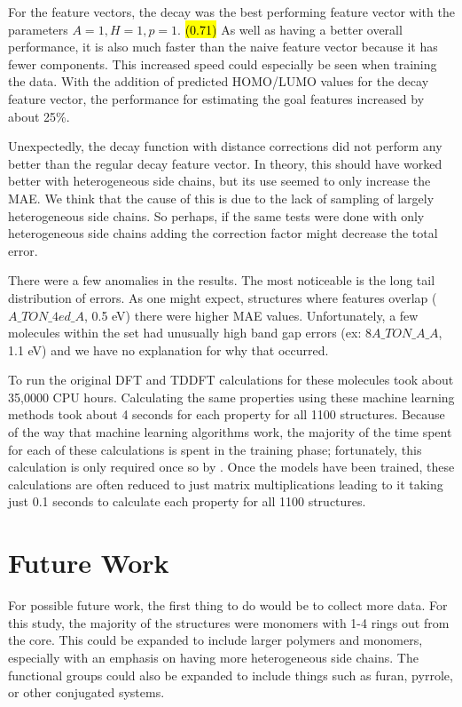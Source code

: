 \documentclass[10pt]{article}
\begin{document}
For the feature vectors, the decay was the best performing feature vector with the parameters $A = 1, H = 1, p = 1$. \hl{(0.71)} As well as having a better overall performance, it is also much faster than the naive feature vector because it has fewer components. This increased speed could especially be seen when training the data.
With the addition of predicted HOMO/LUMO values for the decay feature vector, the performance for estimating the goal features increased by about 25\%.

Unexpectedly, the decay function with distance corrections did not perform any better than the regular decay feature vector. In theory, this should have worked better with heterogeneous side chains, but its use seemed to only increase the MAE. We think that the cause of this is due to the lack of sampling of largely heterogeneous side chains. So perhaps, if the same tests were done with only heterogeneous side chains adding the correction factor might decrease the total error.

There were a few anomalies in the results. The most noticeable is the long tail distribution of errors. As one might expect, structures where features overlap ($A\_TON\_4ed\_A$, 0.5 eV) there were higher MAE values. Unfortunately, a few molecules within the set had unusually high band gap errors (ex: $8A\_TON\_A\_A$, 1.1 eV) and we have no explanation for why that occurred.

To run the original DFT and TDDFT calculations for these molecules took about 35,0000 CPU hours. Calculating the same properties using these machine learning methods took about 4 seconds for each property for all 1100 structures. Because of the way that machine learning algorithms work, the majority of the time spent for each of these calculations is spent in the training phase; fortunately, this calculation is only required once so by . Once the models have been trained, these calculations are often reduced to just matrix multiplications leading to it taking just 0.1 seconds to calculate each property for all 1100 structures.


\section{Future Work}

For possible future work, the first thing to do would be to collect more data. For this study, the majority of the structures were monomers with 1-4 rings out from the core. This could be expanded to include larger polymers and monomers, especially with an emphasis on having more heterogeneous side chains. The functional groups could also be expanded to include things such as furan, pyrrole, or other conjugated systems.
\end{document}
